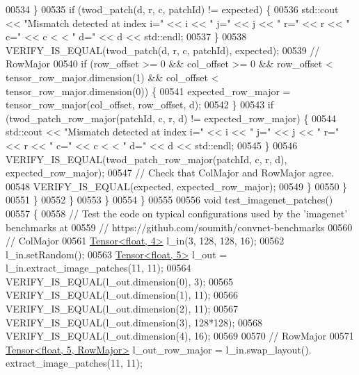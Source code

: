 \begin{DoxyCode}
00534             \}
00535             \textcolor{keywordflow}{if} (twod\_patch(d, r, c, patchId) != expected) \{
00536               std::cout << \textcolor{stringliteral}{"Mismatch detected at index i="} << i << \textcolor{stringliteral}{" j="} << j << \textcolor{stringliteral}{" r="} << r << \textcolor{stringliteral}{" c="} << c <
      < \textcolor{stringliteral}{" d="} << d << std::endl;
00537             \}
00538             VERIFY\_IS\_EQUAL(twod\_patch(d, r, c, patchId), expected);
00539             \textcolor{comment}{// RowMajor}
00540             \textcolor{keywordflow}{if} (row\_offset >= 0 && col\_offset >= 0 && row\_offset < tensor\_row\_major.dimension(1) && 
      col\_offset < tensor\_row\_major.dimension(0)) \{
00541               expected\_row\_major = tensor\_row\_major(col\_offset, row\_offset, d);
00542             \}
00543             \textcolor{keywordflow}{if} (twod\_patch\_row\_major(patchId, c, r, d) != expected\_row\_major) \{
00544               std::cout << \textcolor{stringliteral}{"Mismatch detected at index i="} << i << \textcolor{stringliteral}{" j="} << j << \textcolor{stringliteral}{" r="} << r << \textcolor{stringliteral}{" c="} << c <
      < \textcolor{stringliteral}{" d="} << d << std::endl;
00545             \}
00546             VERIFY\_IS\_EQUAL(twod\_patch\_row\_major(patchId, c, r, d), expected\_row\_major);
00547             \textcolor{comment}{// Check that ColMajor and RowMajor agree.}
00548             VERIFY\_IS\_EQUAL(expected, expected\_row\_major);
00549           \}
00550         \}
00551       \}
00552     \}
00553   \}
00554 \}
00555 
00556 \textcolor{keywordtype}{void} test\_imagenet\_patches()
00557 \{
00558   \textcolor{comment}{// Test the code on typical configurations used by the 'imagenet' benchmarks at}
00559   \textcolor{comment}{// https://github.com/soumith/convnet-benchmarks}
00560   \textcolor{comment}{// ColMajor}
00561   \hyperlink{class_eigen_1_1_tensor}{Tensor<float, 4>} l\_in(3, 128, 128, 16);
00562   l\_in.setRandom();
00563   \hyperlink{class_eigen_1_1_tensor}{Tensor<float, 5>} l\_out = l\_in.extract\_image\_patches(11, 11);
00564   VERIFY\_IS\_EQUAL(l\_out.dimension(0), 3);
00565   VERIFY\_IS\_EQUAL(l\_out.dimension(1), 11);
00566   VERIFY\_IS\_EQUAL(l\_out.dimension(2), 11);
00567   VERIFY\_IS\_EQUAL(l\_out.dimension(3), 128*128);
00568   VERIFY\_IS\_EQUAL(l\_out.dimension(4), 16);
00569 
00570   \textcolor{comment}{// RowMajor}
00571   \hyperlink{class_eigen_1_1_tensor}{Tensor<float, 5, RowMajor>} l\_out\_row\_major = l\_in.swap\_layout().
      extract\_image\_patches(11, 11);

\end{DoxyCode}
